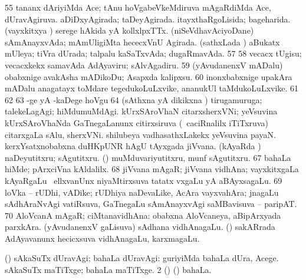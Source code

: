 {\num{55}  tananx dAriyiMda Ace; tAnu hoVgabeVkeMdiruva mAgaRdiMda Ace, dUravAgiruva. 
  
\banum
{} aDiDxyAgirada; taDeyAgirada. 
 itayxthaRgoLisida; bageharida. 
 (vayxkitxya \vi) serege hAkida yA kollxlpxTTx. 
 (niSeVdhavAciyoDane) sAmAnayxvAda; mAmUligiMta hececxVnU Agirada. 
 (sathxLada \vi) aBukatx mUleya; tiVra dUrada; talpalu kaSaTxvAda; dugaRmavAda. 
\eanum
\numie
\num{57}  
\num{58}  vecacx tUgisu; vecacxkekx samavAda AdAyaviru; sAlvAgadiru. 
\num{59}  (yAvudanenxV mADalu) obabxnige avakAsha mADikoDu; Asapxda kalipxsu. 
\num{60}  inonxbabxnige upakAra mADalu anagatayx toMdare tegedukoLuLxvike, ananukUl taMdukoLuLxvike. 
\num{61}  
\num{62}  
\num{63}  -ge yA -kaDege hoVgu 
\num{64}  (sAthxna yA dikikxna \vi) tirugamuruga; talekeLagAgi; hiMdumuMdAgi. 
  
\banum
{} kUrxSAroVhaN citarxsherxVNi; yeVsuvina kUrxSAroVhaNda GaTnegaLanunx citirxsiruva (\kanmu\ caciRnalilx iTiTxruva) citarxgaLa sAlu, sherxVNi. 
 shilubeya vadhasathxLakekx yeVsuvina payaN. 
 kerxYsatxnobabxna duHKpUNR hAgU tAyxgada jiVvana. 
\eanum
\numie
{}  
\banum
{} (kAyaRda \vi) naDeyutitxru; sAgutitxru. 
 (\rUpa) muMduvariyutitxru, munf sAgutitxru. 
\eanum
\numie
\num{67}  bahaLa hiMde; pArxciVna kAldalilx. 
\num{68}  jiVvana mAgaR; jiVvana vidhAna; vayxkitxgaLa kAyaRgaLu \mo\ ellxvanUnx niyaMtirxsuva tatatx vxgaLu yA aBAyxsagaLu. 
\num{69}  loVka -- rUDhi, vADike; rUDhiya naDevaLike, AcAra vayxvahAra; jnagaLu sAdhAraNvAgi vatiRsuva, GaTnegaLu sAmAnayxvAgi saMBavisuva -- paripAT. 
\num{70}  AloVcanA mAgaR; ciMtanavidhAna:  obabxna AloVcaneya, aBipArxyada parxkAra. 
  
\banum
{} (yAvudanenxV gaLisuva) sAdhana vidhAnagaLu. 
 (\birx) sakARrada AdAyavanunx hecicxsuva vidhAnagaLu, karxmagaLu. 
\eanum
\numie
\enum
\emng
\eentry

\bentry
{} 
\gl{\kirxvi}
\expl{}
\bmng
\bnum
{} (\AmA) 
\banum
{} sAkaSuTx dUravAgi; bahaLa dUravAgi:  guriyiMda bahaLa dUra, Acege. 
 sAkaSuTx maTiTxge; bahaLa maTiTxge. 
\eanum
\numie
\num{2} (\ame) (\AmA) bahaLa. 
\enum
\emng
\eentry

}
